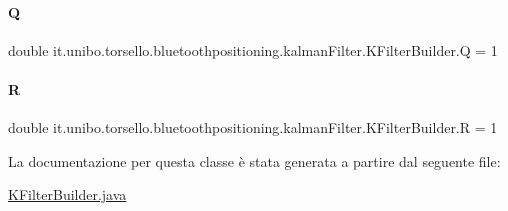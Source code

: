 \paragraph{\texorpdfstring{Q}{Q}}
{\footnotesize\ttfamily double it.\+unibo.\+torsello.\+bluetoothpositioning.\+kalman\+Filter.\+K\+Filter\+Builder.\+Q = 1\hspace{0.3cm}{\ttfamily [private]}}

\hypertarget{classit_1_1unibo_1_1torsello_1_1bluetoothpositioning_1_1kalmanFilter_1_1KFilterBuilder_a22e1c6b090427b1f85c5bc635e78b232_a22e1c6b090427b1f85c5bc635e78b232}{}\label{classit_1_1unibo_1_1torsello_1_1bluetoothpositioning_1_1kalmanFilter_1_1KFilterBuilder_a22e1c6b090427b1f85c5bc635e78b232_a22e1c6b090427b1f85c5bc635e78b232} 
\paragraph{\texorpdfstring{R}{R}}
{\footnotesize\ttfamily double it.\+unibo.\+torsello.\+bluetoothpositioning.\+kalman\+Filter.\+K\+Filter\+Builder.\+R = 1\hspace{0.3cm}{\ttfamily [private]}}



La documentazione per questa classe è stata generata a partire dal seguente file\+:\begin{DoxyCompactItemize}
\item 
\hyperlink{KFilterBuilder_8java}{K\+Filter\+Builder.\+java}\end{DoxyCompactItemize}
